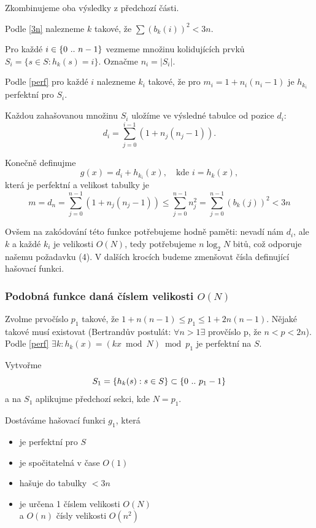 Zkombinujeme oba výsledky z předchozí části.

Podle \eqref{3n} nalezneme $k$ takové, že
$\sum ( b_k(i) )^2 < 3n$.

Pro každé $i \in \{{0}\ ..\ {n-1}\}$ vezmeme množinu kolidujících prvků
$S_i = \{ s \in S : h_k(s) = i \}$.
Označme $n_i = |S_i|$.

Podle \eqref{perf} pro každé $i$ nalezneme $k_i$ takové, že
pro $m_i = 1 + n_i(n_i-1)$ je $h_{k_i}$ perfektní pro $S_i$.

Každou zahašovanou množinu $S_i$ uložíme ve výsledné tabulce od pozice
$d_i$: 
\[
d_i = \sum_{j=0}^{i-1}(1 + n_j(n_j-1)).
\]

Konečně definujme
\[
g(x) = d_i + h_{k_i}(x),\quad\text{kde } i = h_k(x),
\]
která je perfektní a velikost tabulky je
\[
m = d_n = \sum_{j=0}^{n-1}(1 + n_j(n_j-1))
\leq \sum_{j=0}^{n-1} n_j^2
=  \sum_{j=0}^{n-1} (b_k(j))^2
< 3n
\]

Ovšem na zakódování této funkce potřebujeme hodně paměti: 
nevadí nám $d_i$, 
ale $k$ a každé $k_i$ je velikosti $O(N)$, 
tedy potřebujeme $n \log_2 N$ bitů, což odporuje našemu požadavku (4).
V dalších krocích budeme zmenšovat čísla definující hašovací funkci.
\subsubsection{Podobná funkce daná číslem velikosti $O(N)$}

Zvolme prvočíslo $p_1$ takové, že 
$1 +n(n-1) \leq p_1 \leq 1+ 2n(n-1)$. Nějaké takové musí existovat
(Bertrandův postulát: $\forall n>1 \exists$ provčíslo p, že 
$n < p < 2n$).
Podle \eqref{perf} %
$\exists k : h_k(x) = ( kx \bmod N) \bmod p_1$ 
je perfektní na $S$.

Vytvořme
\[
S_1 = \{ h_k(s) : s \in S\} \subset \{{0}\ ..\ {p_1 -1}\}
\]
a na $S_1$ aplikujme předchozí sekci, kde $N = p_1$.

Dostáváme hašovací funkci $g_1$, která
\begin{itemize}
\item je perfektní pro $S$
\item je spočitatelná v čase $O(1)$ 
\item hašuje do tabulky $<3n$ 
\item je určena 1 číslem velikosti $O(N)$ \\
 \quad a $O(n)$ čísly velikosti $O(n^2)$ 
\end{itemize}

